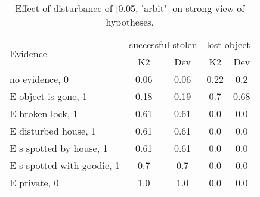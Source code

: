 \begin{table}\begin{tabular}{l|cc|cc}\toprule\multirow{2}{*}{Evidence} & \multicolumn{2}{c}{successful stolen}& \multicolumn{2}{c}{lost object}\\& {K2} & {Dev}& {K2} & {Dev}\\\midrule
no evidence, 0 & 0.06&0.06&0.22&0.2\\E object is gone, 1 & 0.18&0.19&0.7&0.68\\E broken lock, 1 & 0.61&0.61&0.0&0.0\\E disturbed house, 1 & 0.61&0.61&0.0&0.0\\E s spotted by house, 1 & 0.61&0.61&0.0&0.0\\E s spotted with goodie, 1 & 0.7&0.7&0.0&0.0\\E private, 0 & 1.0&1.0&0.0&0.0\\\bottomrule\end{tabular}\caption{Effect of disturbance of [0.05, 'arbit'] on strong view of hypotheses.}\end{table}